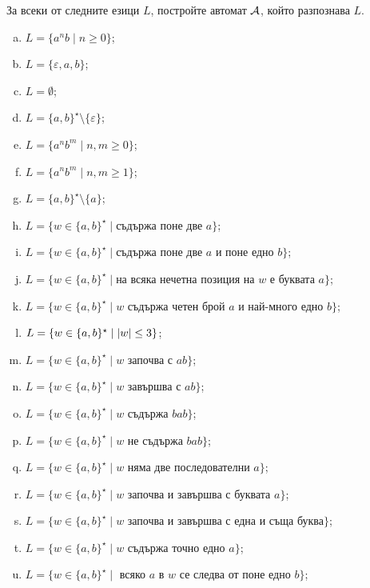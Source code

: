 \begin{problem}
  За всеки от следните езици $L$, постройте автомат $\mathcal{A}$, който разпознава $L$.
  \begin{enumerate}[a)]
  \item 
    $L = \{a^nb\mid n \geq 0\}$;
  \item
    $L = \{\varepsilon, a,b\}$;
  \item
    $L = \emptyset$;
  \item
    $L = \{a,b\}^\star\setminus\{\varepsilon\}$;
  \item
    $L = \{a^nb^m\mid n,m \geq 0\}$;
  \item
    $L = \{a^nb^m\mid n,m \geq 1\}$;
  \item
    $L = \{a,b\}^\star \setminus \{a\}$;
  \item
    $L = \{w \in \{a,b\}^\star \mid \mbox{съдържа поне две }a\}$;
  \item
    $L = \{w \in \{a,b\}^\star \mid \mbox{съдържа поне две }a\mbox{ и поне едно }b\}$;
  \item
    $L = \{w \in \{a,b\}^\star \mid \mbox{на всяка нечетна позиция на }w\mbox{ е буквата }a\}$;
  \item
    $L = \{w \in \{a,b\}^\star \mid w\mbox{ съдържа четен брой }a\mbox{ и най-много едно }b\}$;
  \item
    $L = \{w \in \{a,b\}^\star\mid \vert{w}\vert \leq 3\}$;
  \item
    $L = \{w \in \{a,b\}^\star \mid w \mbox{ започва с }ab\}$;
  \item
    $L = \{w \in \{a,b\}^\star \mid w \mbox{ завършва с }ab\}$;
  \item
    $L = \{w \in \{a,b\}^\star \mid w \mbox{ съдържа }bab\}$;
  \item
    $L = \{w \in \{a,b\}^\star \mid w \mbox{ не съдържа }bab\}$;
  \item
    $L = \{w \in \{a,b\}^\star \mid w \mbox{ няма две последователни }a\}$;
  \item
    $L = \{w \in \{a,b\}^\star \mid w\mbox{ започва и завършва с буквата } a\}$;
  \item
    $L = \{w \in \{a,b\}^\star \mid w\mbox{ започва и завършва с една и съща буква}\}$;
  \item
    $L = \{w \in \{a,b\}^\star \mid w \mbox{ съдържа точно едно }a\}$;
  \item
    $L = \{w \in \{a,b\}^\star \mid \mbox{ всяко }a\mbox{ в }w\mbox{ се следва от поне едно }b\}$;

\end{enumerate}
\end{problem}
